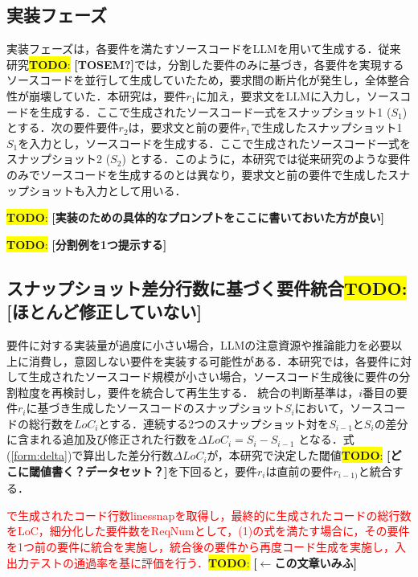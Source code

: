 \documentclass[submit,techrep,noauthor]{ipsj}
\newcommand{\todo}[1]{\colorbox{yellow}{{\bf TODO}:}{\color{red} {\textbf{[#1]}}}}
\begin{document}
\subsection{実装フェーズ}

実装フェーズは，各要件を満たすソースコードをLLMを用いて生成する．従来研究\todo{TOSEM?}では，分割した要件のみに基づき，各要件を実現するソースコードを並行して生成していたため，要求間の断片化が発生し，全体整合性が崩壊していた．本研究は，要件$r_1$に加え，要求文をLLMに入力し，ソースコードを生成する．ここで生成されたソースコード一式をスナップショット1 ($S_1$) とする．次の要件要件$r_2$は，要求文と前の要件$r_1$で生成したスナップショット1$S_1$を入力とし，ソースコードを生成する．ここで生成されたソースコード一式をスナップショット2 ($S_2$) とする．このように，本研究では従来研究のような要件のみでソースコードを生成するのとは異なり，要求文と前の要件で生成したスナップショットも入力として用いる．

\todo{実装のための具体的なプロンプトをここに書いておいた方が良い}

\todo{分割例を1つ提示する}

\subsection{スナップショット差分行数に基づく要件統合\todo{ほとんど修正していない}}

要件に対する実装量が過度に小さい場合，LLMの注意資源や推論能力を必要以上に消費し，意図しない要件を実装する可能性がある．本研究では，各要件に対して生成されたソースコード規模が小さい場合，ソースコード生成後に要件の分割粒度を再検討し，要件を統合して再生生する．
統合の判断基準は，$i$番目の要件$r_i$に基づき生成したソースコードのスナップショット$S_i$において，ソースコードの総行数を$LoC_i$とする．連続する2つのスナップショット対を$S_{i-1}$と$S_i$の差分に含まれる追加及び修正された行数を$\Delta LoC_i = S_i - S_{i-1}$ となる．式(\ref{form:delta})で算出した差分行数$\Delta LoC_i$が，本研究で決定した閾値\todo{どこに閾値書く？データセット？}を下回ると，要件$r_i$は直前の要件$r_{i-1)}$と統合する．

\textcolor{red}{で生成されたコード行数linessnapを取得し，最終的に生成されたコードの総行数をLoC，細分化した要件数をReqNumとして，(1)の式を満たす場合に，その要件を1つ前の要件に統合を実施し，統合後の要件から再度コード生成を実施し，入出力テストの通過率を基に評価を行う．}\todo{$\leftarrow$この文章いみふ}
\end{document}
